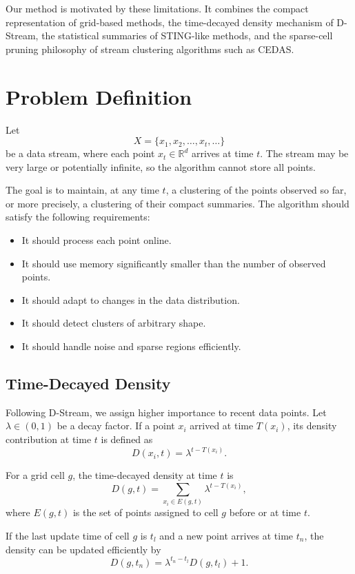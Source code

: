 \documentclass[11pt]{article}
\begin{document}
Our method is motivated by these limitations. It combines the compact representation of grid-based methods, the time-decayed density mechanism of D-Stream, the statistical summaries of STING-like methods, and the sparse-cell pruning philosophy of stream clustering algorithms such as CEDAS.

\section{Problem Definition}

Let
\[
X = \{x_1, x_2, \ldots, x_t, \ldots\}
\]
be a data stream, where each point $x_t \in \mathbb{R}^d$ arrives at time $t$. The stream may be very large or potentially infinite, so the algorithm cannot store all points.

The goal is to maintain, at any time $t$, a clustering of the points observed so far, or more precisely, a clustering of their compact summaries. The algorithm should satisfy the following requirements:

\begin{itemize}
    \item It should process each point online.
    \item It should use memory significantly smaller than the number of observed points.
    \item It should adapt to changes in the data distribution.
    \item It should detect clusters of arbitrary shape.
    \item It should handle noise and sparse regions efficiently.
\end{itemize}

\subsection{Time-Decayed Density}
\label{sec:proposed-method-decay}

Following D-Stream, we assign higher importance to recent data points. Let $\lambda \in (0,1)$ be a decay factor. If a point $x_i$ arrived at time $T(x_i)$, its density contribution at time $t$ is defined as
\[
D(x_i,t) = \lambda^{t - T(x_i)}.
\]

For a grid cell $g$, the time-decayed density at time $t$ is
\[
D(g,t) = \sum_{x_i \in E(g,t)} \lambda^{t - T(x_i)},
\]
where $E(g,t)$ is the set of points assigned to cell $g$ before or at time $t$.

If the last update time of cell $g$ is $t_l$ and a new point arrives at time $t_n$, the density can be updated efficiently by
\[
D(g,t_n) = \lambda^{t_n - t_l} D(g,t_l) + 1.
\]
\end{document}

